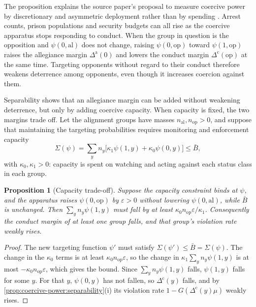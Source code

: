 \documentclass[11pt,letterpaper]{article}
\newtheorem{proposition}[theorem]{Proposition}
\theoremstyle{definition}
\theoremstyle{remark}
\begin{document}
The proposition explains the source paper's proposal to measure coercive power by discretionary and asymmetric deployment rather than by spending \citep[Section 4]{largo2026hbs}. Arrest counts, prison populations and security budgets can all rise as the coercive apparatus stops responding to conduct. When the group in question is the opposition and $\psi(0,\mathrm{al})$ does not change, raising $\psi(0,\mathrm{op})$ toward $\psi(1,\mathrm{op})$ raises the allegiance margin $\Delta^{\mathrm{a}}(0)$ and lowers the conduct margin $\Delta^{\mathrm{c}}(\mathrm{op})$ at the same time. Targeting opponents without regard to their conduct therefore weakens deterrence among opponents, even though it increases coercion against them.

Separability shows that an allegiance margin can be added without weakening deterrence, but only by adding coercive capacity. When capacity is fixed, the two margins trade off. Let the alignment groups have masses $n_{\mathrm{al}}, n_{\mathrm{op}} > 0$, and suppose that maintaining the targeting probabilities requires monitoring and enforcement capacity
\[
\Sigma(\psi) = \sum_{y} n_y\bigl[\kappa_1 \psi(1,y) + \kappa_0 \psi(0,y)\bigr] \le \bar{B},
\]
with $\kappa_0, \kappa_1 > 0$: capacity is spent on watching and acting against each status class in each group.

\begin{proposition}[Capacity trade-off]
\label{prop:coercive-power:capacity}
Suppose the capacity constraint binds at $\psi$, and the apparatus raises $\psi(0,\mathrm{op})$ by $\varepsilon > 0$ without lowering $\psi(0,\mathrm{al})$, while $\bar{B}$ is unchanged. Then $\sum_y n_y \psi(1,y)$ must fall by at least $\kappa_0 n_{\mathrm{op}}\varepsilon/\kappa_1$. Consequently the conduct margin of at least one group falls, and that group's violation rate weakly rises.
\end{proposition}

\begin{proof}
The new targeting function $\psi'$ must satisfy $\Sigma(\psi') \le \bar{B} = \Sigma(\psi)$. The change in the $\kappa_0$ terms is at least $\kappa_0 n_{\mathrm{op}}\varepsilon$, so the change in $\kappa_1\sum_y n_y\psi(1,y)$ is at most $-\kappa_0 n_{\mathrm{op}}\varepsilon$, which gives the bound. Since $\sum_y n_y \psi(1,y)$ falls, $\psi(1,y)$ falls for some $y$. For that $y$, $\psi(0,y)$ has not fallen, so $\Delta^{\mathrm{c}}(y)$ falls, and by \cref{prop:coercive-power:separability}(i) its violation rate $1 - G(\Delta^{\mathrm{c}}(y)\mu)$ weakly rises.
\end{proof}
\end{document}
